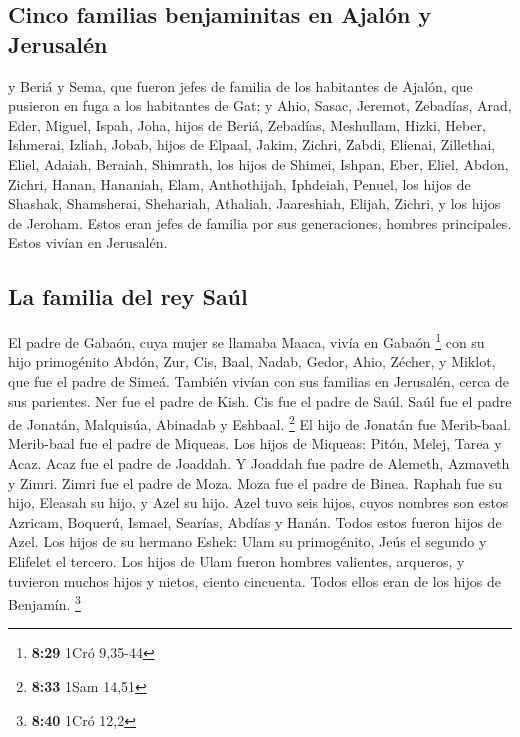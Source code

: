 \begin{paracol}{2}
{\subsection{Cinco familias benjaminitas en Ajalón y
Jerusalén}\label{cinco-familias-benjaminitas-en-ajaluxf3n-y-jerusaluxe9n}}

 y Beriá y Sema, que fueron jefes de familia de los
habitantes de Ajalón, que pusieron en fuga a los habitantes de Gat;
 y Ahio, Sasac, Jeremot,  Zebadías, Arad,
Eder,  Miguel, Ispah, Joha, hijos de Beriá,
 Zebadías, Meshullam, Hizki, Heber, 
Ishmerai, Izliah, Jobab, hijos de Elpaal,  Jakim, Zichri,
Zabdi,  Elienai, Zillethai, Eliel, 
Adaiah, Beraiah, Shimrath, los hijos de Shimei,  Ishpan,
Eber, Eliel,  Abdon, Zichri, Hanan, 
Hananiah, Elam, Anthothijah,  Iphdeiah, Penuel, los hijos
de Shashak,  Shamsherai, Shehariah, Athaliah,
 Jaareshiah, Elijah, Zichri, y los hijos de Jeroham.
 Estos eran jefes de familia por sus generaciones,
hombres principales. Estos vivían en Jerusalén.

\hypertarget{la-familia-del-rey-sauxfal}{%
\subsection{La familia del rey Saúl}\label{la-familia-del-rey-sauxfal}}

 El padre de Gabaón, cuya mujer se llamaba Maaca, vivía
en Gabaón \footnote{\textbf{8:29} 1Cró 9,35-44}  con su
hijo primogénito Abdón, Zur, Cis, Baal, Nadab,  Gedor,
Ahio, Zécher,  y Miklot, que fue el padre de Simeá.
También vivían con sus familias en Jerusalén, cerca de sus parientes.
 Ner fue el padre de Kish. Cis fue el padre de Saúl. Saúl
fue el padre de Jonatán, Malquisúa, Abinadab y Eshbaal. \footnote{\textbf{8:33}
  1Sam 14,51}  El hijo de Jonatán fue Merib-baal.
Merib-baal fue el padre de Miqueas.  Los hijos de
Miqueas: Pitón, Melej, Tarea y Acaz.  Acaz fue el padre
de Joaddah. Y Joaddah fue padre de Alemeth, Azmaveth y Zimri. Zimri fue
el padre de Moza.  Moza fue el padre de Binea. Raphah fue
su hijo, Eleasah su hijo, y Azel su hijo.  Azel tuvo seis
hijos, cuyos nombres son estos Azricam, Boquerú, Ismael, Searías, Abdías
y Hanán. Todos estos fueron hijos de Azel.  Los hijos de
su hermano Eshek: Ulam su primogénito, Jeús el segundo y Elifelet el
tercero.  Los hijos de Ulam fueron hombres valientes,
arqueros, y tuvieron muchos hijos y nietos, ciento cincuenta. Todos
ellos eran de los hijos de Benjamín. \footnote{\textbf{8:40} 1Cró 12,2}


\end{paracol}
